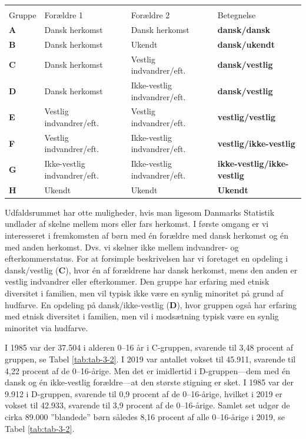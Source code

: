 \documentclass[
]{book}
\begin{document}
\begin{longtable}{llll}
\toprule
 & \multicolumn{2}{c}{} &  \\ 
\cmidrule(lr){2-3}
Gruppe & Forældre 1 & Forældre 2 & Betegnelse \\ 
\midrule\addlinespace[2.5pt]
\textbf{A} & Dansk herkomst & Dansk herkomst & \textbf{dansk/dansk} \\ 
\textbf{B} & Dansk herkomst & Ukendt & \textbf{dansk/ukendt} \\ 
\textbf{C} & Dansk herkomst & Vestlig indvandrer/eft. & \textbf{dansk/vestlig} \\ 
\textbf{D} & Dansk herkomst & Ikke-vestlig indvandrer/eft. & \textbf{dansk/vestlig} \\ 
\textbf{E} & Vestlig indvandrer/eft. & Vestlig indvandrer/eft. & \textbf{vestlig/vestlig} \\ 
\textbf{F} & Vestlig indvandrer/eft. & Ikke-vestlig indvandrer/eft. & \textbf{vestlig/ikke-vestlig} \\ 
\textbf{G} & Ikke-vestlig indvandrer/eft. & Ikke-vestlig indvandrer/eft. & \textbf{ikke-vestlig/ikke-vestlig} \\ 
\textbf{H} & Ukendt & Ukendt & \textbf{Ukendt} \\ 
\bottomrule
\end{longtable}

Udfaldsrummet har otte muligheder, hvis man ligesom Danmarks Statistik undlader af skelne mellem mors eller fars herkomst. I første omgang er vi interesseret i fremkomsten af børn med én forældre med dansk herkomst og én med anden herkomst. Dvs. vi skelner ikke mellem indvandrer- og efterkommerstatus. For at forsimple beskrivelsen har vi foretaget en opdeling i dansk/vestlig (\textbf{C}), hvor én af forældrene har dansk herkomst, mens den anden er vestlig indvandrer eller efterkommer. Den gruppe har erfaring med etnisk diversitet i familien, men vil typisk ikke være en synlig minoritet på grund af hudfarve. En opdeling på dansk/ikke-vestlig (\textbf{D}), hvor gruppen også har erfaring med etnisk diversitet i familien, men vil i modsætning typisk være en synlig minoritet via hudfarve.

I 1985 var der 37.504 i alderen 0--16 år i C-gruppen, svarende til 3,48 procent af gruppen, se Tabel \ref{tab:tab-3-2}. I 2019 var antallet vokset til 45.911, svarende til 4,22 procent af de 0--16-årige. Men det er imidlertid i D-gruppen---dem med én dansk og én ikke-vestlig forældre---at den største stigning er sket. I 1985 var der 9.912 i D-gruppen, svarende til 0,9 procent af de 0--16-årige, hvilket i 2019 er vokset til 42.933, svarende til 3,9 procent af de 0--16-årige. Samlet set udgør de cirka 89.000 ''blandede'' børn således 8,16 procent af alle 0--16-årige i 2019, se Tabel \ref{tab:tab-3-2}.
\end{document}
